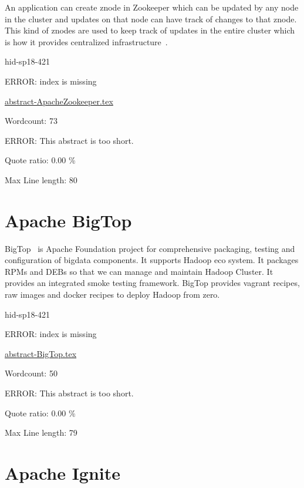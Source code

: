 An application can create znode in Zookeeper which can be updated by any node in
the cluster and updates on that node can have track of changes to that znode.
This kind of znodes are used to keep track of updates in the entire cluster
which is how it provides centralized 
infrastructure~\cite{hid-sp18-421-zookeeper}.




\begin{IU}

hid-sp18-421

ERROR: index is missing

\href{https://github.com/cloudmesh-community/hid-sp18-421/blob/master//technology/abstract-ApacheZookeeper.tex}{abstract-ApacheZookeeper.tex}

 

Wordcount: 73

ERROR: This abstract is too short.


Quote ratio: 0.00 \%
 
Max Line length: 80
\end{IU}

\section{Apache BigTop}

BigTop~\cite{hid-sp18-421-BigTopCloud} is Apache Foundation project for
comprehensive packaging, testing and configuration of bigdata components. It
supports Hadoop eco system. It packages RPMs and DEBs so that we can manage and
maintain Hadoop Cluster. It provides an integrated smoke testing framework.
BigTop provides vagrant recipes, raw images and docker recipes to deploy Hadoop
from zero.



\begin{IU}

hid-sp18-421

ERROR: index is missing

\href{https://github.com/cloudmesh-community/hid-sp18-421/blob/master//technology/abstract-BigTop.tex}{abstract-BigTop.tex}

 

Wordcount: 50

ERROR: This abstract is too short.


Quote ratio: 0.00 \%
 
Max Line length: 79
\end{IU}

\section{Apache Ignite}

